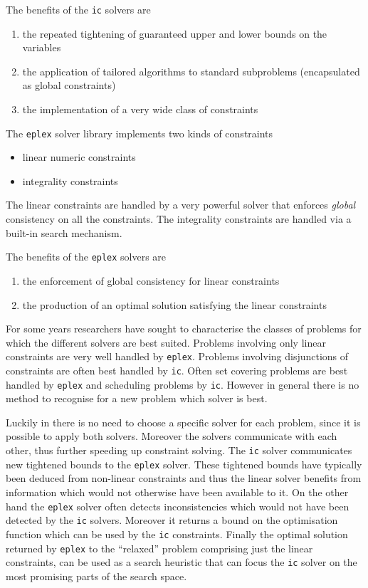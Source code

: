 The benefits of the {\tt ic} solvers are
\begin{enumerate}
\item the repeated tightening of guaranteed upper and lower bounds on the
variables
\item the application of tailored algorithms to standard subproblems
(encapsulated as global constraints)
\item the implementation of a very wide class of constraints
\end{enumerate}

The {\tt eplex} solver library implements two kinds of constraints
\begin{itemize}
\item linear numeric constraints
\item integrality constraints
\end{itemize}
The linear constraints are handled by a very powerful solver that
enforces {\em global} consistency on all the constraints.
The integrality constraints are handled via a built-in search
mechanism.

The benefits of the {\tt eplex} solvers are
\begin{enumerate}
\item the enforcement of global consistency for linear constraints
\item the production of an optimal solution satisfying the linear constraints
\end{enumerate}

For some years researchers have sought to characterise the classes of
problems for which the different solvers are best suited.  
Problems involving only linear constraints are very well handled by
{\tt eplex}.
Problems involving disjunctions of constraints are often best
handled by {\tt ic}.
Often set covering problems are best handled by {\tt eplex} and
scheduling problems by {\tt ic}.
However in general there is no method to recognise for a new problem
which solver is best.

Luckily in \eclipse{} there is no need to choose a specific solver for each
problem, since it is possible to apply both solvers.  Moreover the
solvers communicate with each other, thus further speeding up constraint
solving.
The {\tt ic} solver communicates new tightened bounds to the 
{\tt eplex} solver.  These tightened bounds have typically been deduced
from non-linear constraints and thus the linear solver benefits from
information which would not otherwise have been available to it.
On the other hand the {\tt eplex} solver often detects inconsistencies
which would not have been detected by the {\tt ic} solvers.  Moreover
it returns a bound on the optimisation function which can be used by
the {\tt ic} constraints.  
Finally the optimal solution returned by {\tt eplex} to the
``relaxed'' problem
comprising just the linear constraints, can be used as a
search heuristic that can focus the {\tt ic} solver on the most
promising parts of the search space.

